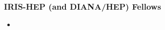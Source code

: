 \begin{frame}
\frametitle{IRIS-HEP (and DIANA/HEP) Fellows}

\begin{itemize}
\item 
\end{itemize}

\end{frame}


